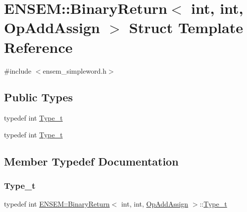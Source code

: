 \hypertarget{structENSEM_1_1BinaryReturn_3_01int_00_01int_00_01OpAddAssign_01_4}{}\section{E\+N\+S\+EM\+:\+:Binary\+Return$<$ int, int, Op\+Add\+Assign $>$ Struct Template Reference}
\label{structENSEM_1_1BinaryReturn_3_01int_00_01int_00_01OpAddAssign_01_4}


{\ttfamily \#include $<$ensem\+\_\+simpleword.\+h$>$}

\subsection*{Public Types}
\begin{DoxyCompactItemize}
\item 
typedef int \mbox{\hyperlink{structENSEM_1_1BinaryReturn_3_01int_00_01int_00_01OpAddAssign_01_4_a59ccfa49f2916c58be8fcfb51e252c15}{Type\+\_\+t}}
\item 
typedef int \mbox{\hyperlink{structENSEM_1_1BinaryReturn_3_01int_00_01int_00_01OpAddAssign_01_4_a59ccfa49f2916c58be8fcfb51e252c15}{Type\+\_\+t}}
\end{DoxyCompactItemize}


\subsection{Member Typedef Documentation}
\mbox{\label{structENSEM_1_1BinaryReturn_3_01int_00_01int_00_01OpAddAssign_01_4_a59ccfa49f2916c58be8fcfb51e252c15}} 
\subsubsection{\texorpdfstring{Type\_t}{Type\_t}\hspace{0.1cm}{\footnotesize\ttfamily [1/2]}}
{\footnotesize\ttfamily typedef int \mbox{\hyperlink{structENSEM_1_1BinaryReturn}{E\+N\+S\+E\+M\+::\+Binary\+Return}}$<$ int, int, \mbox{\hyperlink{structENSEM_1_1OpAddAssign}{Op\+Add\+Assign}} $>$\+::\mbox{\hyperlink{structENSEM_1_1BinaryReturn_3_01int_00_01int_00_01OpAddAssign_01_4_a59ccfa49f2916c58be8fcfb51e252c15}{Type\+\_\+t}}}

